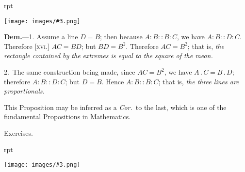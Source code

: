 \documentclass[oneside]{book}
\newcounter{wrapwidth}
\newcommand\exhead[1]{
\Needspace*{5\baselineskip}\begin{center}
\textsf{#1}
\end{center}
}
\newcommand\imgflow[3]{
\setcounter{wrapwidth}{#1}
\begin{wrapfigure}[#2]{r}{\value{wrapwidth}pt}
\begin{center}
\vspace{-0.3in}
\texttt{[image: images/\#3.png]}
\end{center}
\end{wrapfigure}
}
\begin{document}
\imgflow{118}{6}{f189}

\textbf{Dem.}---1. Assume a line $D = B$; then because $A : B
:: B : C$, we have $A : B :: D : C$.
Therefore [\textsc{xvi.}]\label{XVI} $AC = BD$; but
$BD = B^{2}$. Therefore $AC = B^{2}$;
that is, \emph{the rectangle contained
by the extremes is equal to the
square of the mean.}

2.~The same construction being made, since $AC = B^{2}$,
we have $A\,.\,C = B\,.\,D$; therefore $A : B :: D : C$; but
$D = B$. Hence $A : B :: B : C$; that is, \emph{the three lines
are proportionals.}

\smallskip
\begin{footnotesize}
This Proposition may be inferred as a \emph{Cor.}\ to the last, which
is one of the fundamental Propositions in Mathematics.
\par\end{footnotesize}


\exhead{Exercises.}

\imgflow{100}{12}{f190}
\end{document}
